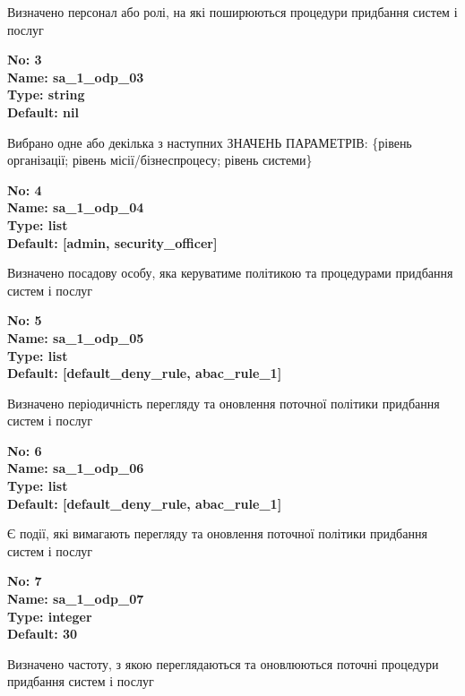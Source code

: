 \documentclass{article}
\begin{document}
{\footnotesize Визначено персонал або ролі, на які поширюються процедури придбання систем і послуг}


{\footnotesize\bfseries
No: 3\\
Name: sa\_\allowbreak{}1\_\allowbreak{}odp\_\allowbreak{}03\\
Type: string\\
Default: nil
}

{\footnotesize Вибрано одне або декілька з наступних ЗНАЧЕНЬ ПАРАМЕТРІВ: \{рівень організації; рівень місії/бізнеспроцесу; рівень системи\}}


{\footnotesize\bfseries
No: 4\\
Name: sa\_\allowbreak{}1\_\allowbreak{}odp\_\allowbreak{}04\\
Type: list\\
Default: [\textquotedbl{}admin\textquotedbl{}, \textquotedbl{}security\_\allowbreak{}officer\textquotedbl{}]
}

{\footnotesize Визначено посадову особу, яка керуватиме політикою та процедурами придбання систем і послуг}


{\footnotesize\bfseries
No: 5\\
Name: sa\_\allowbreak{}1\_\allowbreak{}odp\_\allowbreak{}05\\
Type: list\\
Default: [\textquotedbl{}default\_\allowbreak{}deny\_\allowbreak{}rule\textquotedbl{}, \textquotedbl{}abac\_\allowbreak{}rule\_\allowbreak{}1\textquotedbl{}]
}

{\footnotesize Визначено періодичність перегляду та оновлення поточної політики придбання систем і послуг}


{\footnotesize\bfseries
No: 6\\
Name: sa\_\allowbreak{}1\_\allowbreak{}odp\_\allowbreak{}06\\
Type: list\\
Default: [\textquotedbl{}default\_\allowbreak{}deny\_\allowbreak{}rule\textquotedbl{}, \textquotedbl{}abac\_\allowbreak{}rule\_\allowbreak{}1\textquotedbl{}]
}

{\footnotesize Є події, які вимагають перегляду та оновлення поточної політики придбання систем і послуг}


{\footnotesize\bfseries
No: 7\\
Name: sa\_\allowbreak{}1\_\allowbreak{}odp\_\allowbreak{}07\\
Type: integer\\
Default: 30
}

{\footnotesize Визначено частоту, з якою переглядаються та оновлюються поточні процедури придбання систем і послуг}
\end{document}
